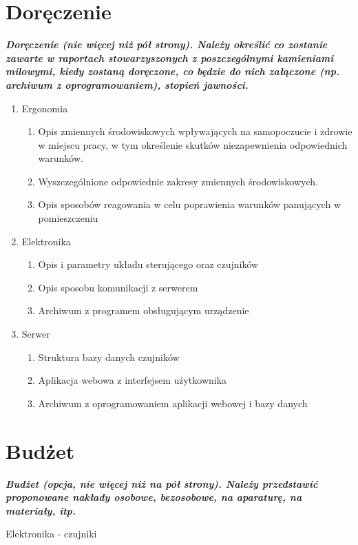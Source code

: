 \documentclass[10pt, a4paper]{article}
\begin{document}
\section{Doręczenie}
\textit{\textbf{Doręczenie (nie więcej niż pół strony). Należy określić co zostanie zawarte w raportach stowarzyszonych z poszczególnymi kamieniami milowymi, kiedy zostaną doręczone, co będzie do nich załączone (np. archiwum z oprogramowaniem), stopień jawności.}}


\begin{enumerate}
\item Ergonomia
	\begin{enumerate}
	\item Opis zmiennych środowiskowych wpływających na samopoczucie i zdrowie w miejscu pracy, w tym określenie skutków niezapewnienia odpowiednich warunków.
	\item Wyszczególnione odpowiednie zakresy zmiennych środowiskowych.
	\item Opis sposobów reagowania w celu poprawienia warunków panujących w pomieszczeniu
	\end{enumerate}
\item Elektronika
	\begin{enumerate}
	\item Opis i parametry układu sterującego oraz czujników
	\item Opis sposobu komunikacji z serwerem
	\item Archiwum z programem obsługującym urządzenie
	\end{enumerate}
\item Serwer
	\begin{enumerate}
	\item Struktura bazy danych czujników
	\item Aplikacja webowa z interfejsem użytkownika
	\item Archiwum z oprogramowaniem aplikacji webowej i bazy danych
	\end{enumerate}
\end{enumerate}


\section{Budżet}
\textit{\textbf{Budżet (opcja, nie więcej niż na pół strony). Należy przedstawić proponowane nakłady osobowe, bezosobowe, na aparaturę, na materiały, itp.}}

\begin{description}[font=$\bullet$~\normalfont]
\item Elektronika - czujniki
\end{description}
\end{document}
